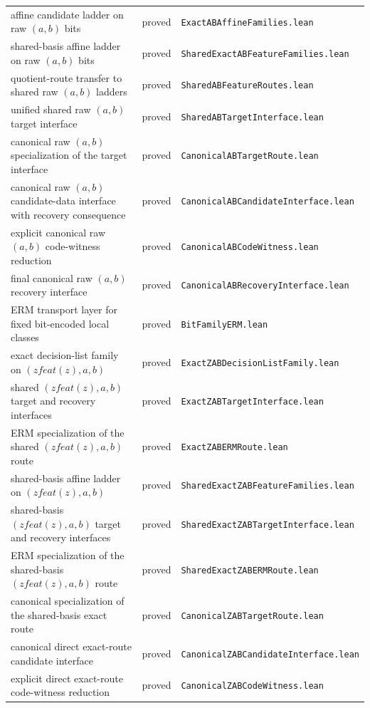 \documentclass[11pt]{article}
\theoremstyle{remark}
\begin{document}
\begin{center}
\begin{tabular}{lll}
affine candidate ladder on raw $(a,b)$ bits & proved & \texttt{ExactABAffineFamilies.lean} \\
shared-basis affine ladder on raw $(a,b)$ bits & proved & \texttt{SharedExactABFeatureFamilies.lean} \\
quotient-route transfer to shared raw $(a,b)$ ladders & proved & \texttt{SharedABFeatureRoutes.lean} \\
unified shared raw $(a,b)$ target interface & proved & \texttt{SharedABTargetInterface.lean} \\
canonical raw $(a,b)$ specialization of the target interface & proved & \texttt{CanonicalABTargetRoute.lean} \\
canonical raw $(a,b)$ candidate-data interface with recovery consequence & proved & \texttt{CanonicalABCandidateInterface.lean} \\
explicit canonical raw $(a,b)$ code-witness reduction & proved & \texttt{CanonicalABCodeWitness.lean} \\
final canonical raw $(a,b)$ recovery interface & proved & \texttt{CanonicalABRecoveryInterface.lean} \\
ERM transport layer for fixed bit-encoded local classes & proved & \texttt{BitFamilyERM.lean} \\
exact decision-list family on $(zfeat(z),a,b)$ & proved & \texttt{ExactZABDecisionListFamily.lean} \\
shared $(zfeat(z),a,b)$ target and recovery interfaces & proved & \texttt{ExactZABTargetInterface.lean} \\
ERM specialization of the shared $(zfeat(z),a,b)$ route & proved & \texttt{ExactZABERMRoute.lean} \\
shared-basis affine ladder on $(zfeat(z),a,b)$ & proved & \texttt{SharedExactZABFeatureFamilies.lean} \\
shared-basis $(zfeat(z),a,b)$ target and recovery interfaces & proved & \texttt{SharedExactZABTargetInterface.lean} \\
ERM specialization of the shared-basis $(zfeat(z),a,b)$ route & proved & \texttt{SharedExactZABERMRoute.lean} \\
canonical specialization of the shared-basis exact route & proved & \texttt{CanonicalZABTargetRoute.lean} \\
canonical direct exact-route candidate interface & proved & \texttt{CanonicalZABCandidateInterface.lean} \\
explicit direct exact-route code-witness reduction & proved & \texttt{CanonicalZABCodeWitness.lean} \\

\end{tabular}
\end{center}
\end{document}
